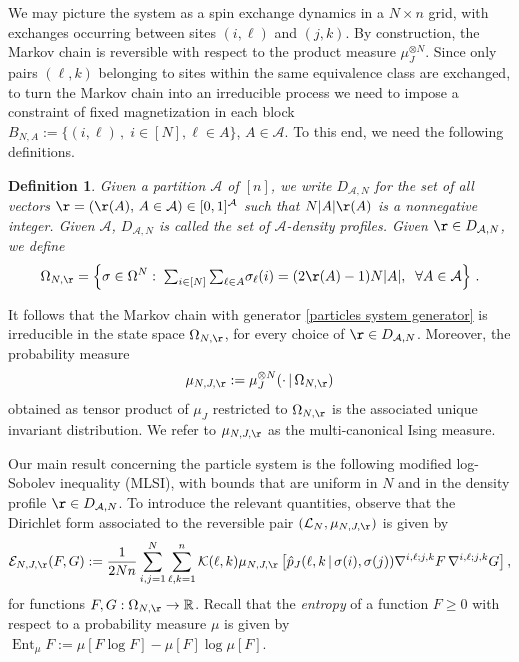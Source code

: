 \documentclass[11pt,reqno]{amsart}
\numberwithin{equation}{section}
\numberwithin{figure}{section}
\newtheorem{definition}[theorem]{Definition}
\newcommand{\1}{\mathds{1}}
\newcommand{\tc}{\,|\,}
\let\si=\sigma
\let\O=\Omega
\newcommand{\cA}{\ensuremath{\mathcal A}}
\newcommand{\cK}{\ensuremath{\mathcal K}}
\newcommand{\cL}{\ensuremath{\mathcal L}}
\begin{document}
We may picture the system as a spin exchange dynamics in a $N\times n$ grid, with exchanges occurring between sites $(i,\ell)$ and $(j,k)$. By construction, the Markov chain is reversible with respect to the product measure $\mu_J^{\otimes N}$. 
Since only pairs $(\ell,k)$ belonging to sites within the same equivalence class are exchanged,  to turn the Markov chain into an irreducible process we need to impose a constraint of fixed magnetization in each block $B_{N,A}:=\{(i,\ell)\,,\; i\in[N], \ell\in A\}$, $A\in\cA$. To this end, we need the following definitions. 
\begin{definition}\label{def:NAmag}
Given a partition $\cA$ of $[n]$, we write $D_{\cA,N}$ for the set of all vectors $\r=(\r(A),\,A\in\cA)\in[0,1]^\cA$ such that $N|A|\r(A)$ %
is a nonnegative integer. Given $\cA$,  $D_{\cA,N}$ is called the set of $\cA$-\emph{density profiles}. Given $\r\in D_{\cA,N}$, we define
\begin{equation}\label{eq:AmagO}
\O_{N,\r}= \left\{\si\in\O^N: \; \textstyle{\sum_{i\in [N]}\sum_{\ell\in A}}\si_\ell(i)=(2\r(A)-1)N|A|,\; \;\forall A\in\cA\right\}\,.
            \end{equation}
\end{definition}
It follows that the Markov chain with generator \eqref{particles system generator} is irreducible in the state space $\O_{N,\r}$, for every choice of $\r\in D_{\cA,N}$. Moreover, the probability measure 
\begin{equation}\label{eq:pbm}
\mu_{N,J,\r}:=\mu_J^{\otimes N}(\cdot\tc\O_{N,\r})
\end{equation} 
obtained as tensor product of $\mu_J$ restricted to $\O_{N,\r}$ is the associated unique invariant distribution.  We refer to $\mu_{N,J,\r}$ as the multi-canonical Ising measure. 

Our main result concerning the particle system is the following modified log-Sobolev inequality (MLSI), with bounds that are uniform in $N$ and in the density profile $\r\in D_{\cA,N}$. 
To introduce the relevant quantities, observe that the Dirichlet form associated to the reversible pair  $(\cL_N,\mu_{N,J,\r})$ is given by 
\begin{equation}\label{Dirichlet form}
\mathcal{E}_{N, J,\r}(F, G) := \frac{1}{2Nn} \sum_{i,j=1}^N \sum_{\ell,k =1}^n \cK(\ell,k)\mu_{N,J,\r}\left[ \hat p_J(\ell,k\tc \sigma(i), \sigma(j)) \nabla^{i,\ell;j,k}F\,\nabla^{i,\ell;j,k}G \right],
\end{equation}
for functions \(F, G : \O_{N,\r} \to \mathbb{R}\). Recall  that the {\em entropy} of a function $F\ge 0$ with respect to a probability measure $\mu$  is given by 
\(\operatorname{Ent}_{\mu}F := \mu[F \log F] - \mu[F] \log \mu[F]\).
\end{document}

